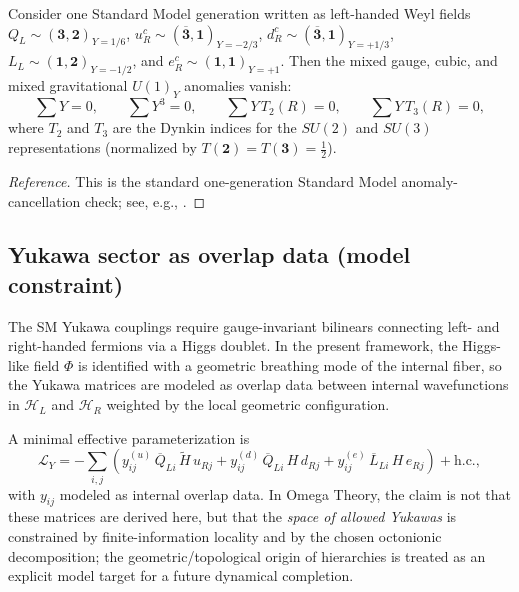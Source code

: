 \begin{lemma}
\label{lemma:sm_anomaly_cancellation}
Consider one Standard Model generation written as left-handed Weyl fields \cite{PeskinSchroeder1995}
$Q_L\sim(\mathbf{3},\mathbf{2})_{Y=1/6}$, $u_R^c\sim(\overline{\mathbf{3}},\mathbf{1})_{Y=-2/3}$,
$d_R^c\sim(\overline{\mathbf{3}},\mathbf{1})_{Y=+1/3}$,
$L_L\sim(\mathbf{1},\mathbf{2})_{Y=-1/2}$, and $e_R^c\sim(\mathbf{1},\mathbf{1})_{Y=+1}$.
Then the mixed gauge, cubic, and mixed gravitational $U(1)_Y$ anomalies vanish:
\begin{equation}
    \sum Y = 0,\qquad \sum Y^3=0,\qquad
    \sum Y\,T_2(R)=0,\qquad \sum Y\,T_3(R)=0,
\end{equation}
where $T_2$ and $T_3$ are the Dynkin indices for the $SU(2)$ and $SU(3)$ representations (normalized by $T(\mathbf{2})=T(\mathbf{3})=\tfrac12$).
\end{lemma}
\begin{proof}[Reference]
This is the standard one-generation Standard Model anomaly-cancellation check; see, e.g., \cite{PeskinSchroeder1995}.
\end{proof}

\subsection{Yukawa sector as overlap data (model constraint)}
The SM Yukawa couplings require gauge-invariant bilinears connecting left- and right-handed fermions via a Higgs doublet. In the present framework, the Higgs-like field $\Phi$ is identified with a geometric breathing mode of the internal fiber, so the Yukawa matrices are modeled as overlap data between internal wavefunctions in $\mathcal{H}_L$ and $\mathcal{H}_R$ weighted by the local geometric configuration.\par
\noindent
A minimal effective parameterization is
\begin{equation}
    \mathcal{L}_{Y} = - \sum_{i,j}\left( y^{(u)}_{ij}\,\overline{Q}_{Li}\,\tilde{H}\,u_{Rj} + y^{(d)}_{ij}\,\overline{Q}_{Li}\,H\,d_{Rj} + y^{(e)}_{ij}\,\overline{L}_{Li}\,H\,e_{Rj} \right) + \mathrm{h.c.},
\end{equation}
with $y_{ij}$ modeled as internal overlap data. In Omega Theory, the claim is not that these matrices are derived here, but that the \emph{space of allowed Yukawas} is constrained by finite-information locality and by the chosen octonionic decomposition; the geometric/topological origin of hierarchies is treated as an explicit model target for a future dynamical completion.

